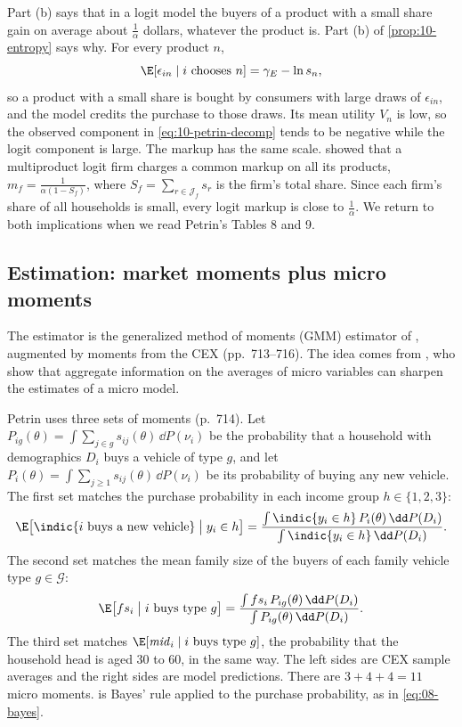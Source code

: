 Part (b) says that in a logit model the buyers of a product with a small share gain on average about $\frac{1}{\alpha}$
dollars, whatever the product is. Part (b) of \cref{prop:10-entropy} says why. For every product $n$,
\begin{equation*}
  \E[\epsilon_{in} \mid i \text{ chooses } n] = \gamma_E - \ln s_n ,
\end{equation*}
so a product with a small share is bought by consumers with large draws of $\epsilon_{in}$, and the model credits the
purchase to those draws. Its mean utility $V_n$ is low, so the observed component in \eqref{eq:10-petrin-decomp} tends
to be negative while the logit component is large. The markup has the same scale. 
showed that a multiproduct logit firm charges a common markup on all its products, $m_f = \frac{1}{\alpha(1 - S_f)}$,
where $S_f = \sum_{r\in\mathcal{J}_f}s_r$ is the firm's total share. Since each firm's share of all households is small,
every logit markup is close to $\frac{1}{\alpha}$. We return to both implications when we read Petrin's Tables 8 and 9.

\subsection{Estimation: market moments plus micro moments}\label{sec:10-petrin-estimation}

The estimator is the generalized method of moments (GMM) estimator of \citet{BerryLevinsohnPakes1995}, augmented by
moments from the CEX (pp.~713--716). The idea comes from \citet{ImbensLancaster1994}, who show that aggregate
information on the averages of micro variables can sharpen the estimates of a micro model.

 Petrin uses three sets of moments (p.~714). Let $P_{ig}(\theta) = \int\sum_{j\in g}s_{ij}(\theta)
\,\dd P(\nu_i)$ be the probability that a household with demographics $D_i$ buys a vehicle of type $g$, and let
$P_{i}(\theta) = \int \sum_{j\ge1}s_{ij}(\theta)\,\dd P(\nu_i)$ be its probability of buying any new vehicle. The first
set matches the purchase probability in each income group $h \in \{1,2,3\}$:
\begin{equation}\label{eq:10-petrin-mm1}
  \E\bigl[\indic\{i \text{ buys a new vehicle}\} \bigm| y_i \in h\bigr]
  = \frac{\int \indic\{y_i\in h\}\,P_i(\theta)\,\dd P(D_i)}{\int\indic\{y_i\in h\}\,\dd P(D_i)} .
\end{equation}
The second set matches the mean family size of the buyers of each family vehicle type $g \in \mathcal{G}$:
\begin{equation}\label{eq:10-petrin-mm2}
  \E\bigl[fs_i \bigm| i \text{ buys type } g\bigr] = \frac{\int fs_i\,P_{ig}(\theta)\,\dd P(D_i)}{\int P_{ig}(\theta)\,\dd P(D_i)} .
\end{equation}
The third set matches $\E[\mathit{mid}_i \mid i \text{ buys type } g]$, the probability that the household head is aged
30 to 60, in the same way. The left sides are CEX sample averages and the right sides are model predictions. There
are $3 + 4 + 4 = 11$ micro moments.  is Bayes' rule applied to the purchase
probability, as in \eqref{eq:08-bayes}.


